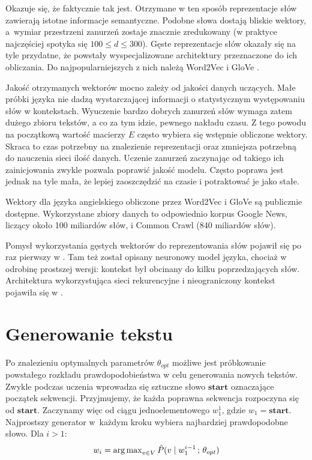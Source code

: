 Okazuje się, że faktycznie tak jest. Otrzymane w ten sposób reprezentacje słów zawierają istotne informacje semantyczne. Podobne słowa dostają bliskie wektory, a~wymiar przestrzeni zanurzeń zostaje znacznie zredukowany (w praktyce najczęściej spotyka się $100 \leq d \leq 300$). Gęste reprezentacje słów okazały się na tyle przydatne, że powstały wyspecjalizowane architektury przeznaczone do ich obliczania. Do najpopularniejszych z nich należą Word2Vec \cite{w2v} i GloVe \cite{glove}.

Jakość otrzymanych wektorów mocno zależy od jakości danych uczących. Małe próbki języka nie dadzą wystarczającej informacji o statystycznym występowaniu słów w kontekstach. Wyuczenie bardzo dobrych zanurzeń słów wymaga zatem dużego zbioru tekstów, a co za tym idzie, pewnego nakładu czasu. Z tego powodu na początkową wartość macierzy $E$ często wybiera się wstępnie obliczone wektory. Skraca to czas potrzebny na znalezienie reprezentacji oraz zmniejsza potrzebną do nauczenia sieci ilość danych. Uczenie zanurzeń zaczynając od takiego ich zainicjowania zwykle pozwala poprawić jakość modelu. Często poprawa jest jednak na tyle mała, że lepiej zaoszczędzić na czasie i potraktować je jako stałe.

Wektory dla języka angielskiego obliczone przez Word2Vec i GloVe są publicznie dostępne. Wykorzystane zbiory danych to odpowiednio korpus Google News, liczący około 100 miliardów słów, i Common Crawl (840 miliardów słów).

Pomysł wykorzystania gęstych wektorów do reprezentowania słów pojawił się po raz pierwszy w \cite{bengiolm}. Tam też został opisany neuronowy model języka, chociaż w odrobinę prostszej wersji: kontekst był obcinany do kilku poprzedzających słów. Architektura wykorzystująca sieci rekurencyjne i nieograniczony kontekst pojawiła się w \cite{rnnlm}.


\section{Generowanie tekstu}\label{gen}
Po znalezieniu optymalnych parametrów $\theta_{opt}$ możliwe jest próbkowanie powstałego rozkładu prawdopodobieństwa w celu generowania nowych tekstów. Zwykle podczas uczenia wprowadza się sztuczne słowo $\mathbf{start}$ oznaczające początek sekwencji. Przyjmujemy, że każda poprawna sekwencja rozpoczyna się od $\mathbf{start}$. Zaczynamy więc od ciągu jednoelementowego $w_1^1$, gdzie $w_1 = \mathbf{start}$. Najprostszy generator w~każdym kroku wybiera najbardziej prawdopodobne słowo. Dla $i>1$:
\[w_i = \operatorname{arg\,max}\limits_{v \in V} \hat{P}(v \mid w_1^{i-1}\, ;\, \theta_{opt})\]

